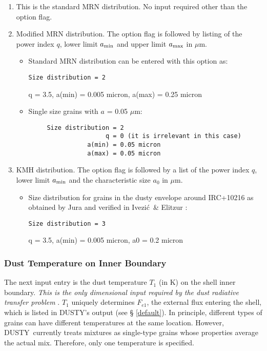 \documentclass[12pt]{article} \usepackage{epsf}
\def\D  {{\sf DUSTY}}
\def\mic    {\hbox{$\mu$m}}
\def\Ivezic {Ivezi\'c}
\begin{document}
\begin{enumerate}

\item This is the standard MRN distribution.  No input required other than the
option flag.

\item Modified MRN distribution.  The option flag is followed by listing of the
power index $q$, lower limit $a_{\rm min}$ and upper limit $a_{\rm max}$ in
\mic.

\begin{itemize}
\item Standard MRN distribution can be entered with this option as:

{\tt  Size distribution = 2

 q = 3.5, a(min) = 0.005 micron, a(max) = 0.25 micron}

\item Single size grains with $a$ = 0.05 \mic:

\begin{verbatim}
     Size distribution = 2
                     q = 0 (it is irrelevant in this case)
                a(min) = 0.05 micron
                a(max) = 0.05 micron
     \end{verbatim}

\end{itemize}

\item KMH distribution.  The option flag is followed by a list of the power
index $q$, lower limit $a_{\rm min}$ and the characteristic size $a_0$ in \mic.

\begin{itemize}
\item Size distribution for grains in the dusty envelope around IRC+10216 as
obtained by Jura \cite{Jura} and verified in \Ivezic\ \& Elitzur \cite{IE96b}:

{\tt  Size distribution = 3

 q = 3.5, a(min) = 0.005 micron, a0 = 0.2 micron}

\end{itemize}
\end{enumerate}

\subsubsection{Dust Temperature on Inner Boundary}
\label{Td}

The next input entry is the dust temperature $T_1$ (in K) on the shell inner
boundary.  {\em This is the only dimensional input required by the dust
radiative transfer problem} \cite{IE97}. $T_1$ uniquely determines $F_{e1}$,
the external flux entering the shell, which is listed in \D's output (see \S
\ref{default}). In principle, different types of grains can have different
temperatures at the same location. However, \D\ currently treats mixtures as
single-type grains whose properties average the actual mix. Therefore, only one
temperature is specified.
\end{document}

